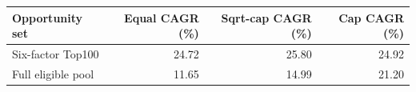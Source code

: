 \begin{tabular}{lrrr}
\toprule
Opportunity set & Equal CAGR (\%) & Sqrt-cap CAGR (\%) & Cap CAGR (\%) \\
\midrule
Six-factor Top100 & 24.72 & 25.80 & 24.92 \\
Full eligible pool & 11.65 & 14.99 & 21.20 \\
\bottomrule
\end{tabular}
